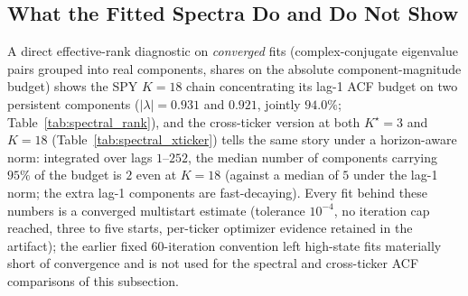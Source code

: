 \subsection{What the Fitted Spectra Do and Do Not Show}
\label{sec:fitted_spectra}

A direct effective-rank diagnostic on \emph{converged} fits (complex-conjugate eigenvalue pairs grouped into real components, shares on the absolute component-magnitude budget) shows the SPY $K = 18$ chain concentrating its lag-1 ACF budget on two persistent components ($|\lambda| = 0.931$ and $0.921$, jointly $94.0\%$; Table~\ref{tab:spectral_rank}), and the cross-ticker version at both $K^\star = 3$ and $K = 18$ (Table~\ref{tab:spectral_xticker}) tells the same story under a horizon-aware norm: integrated over lags $1$--$252$, the median number of components carrying $95\%$ of the budget is $2$ even at $K = 18$ (against a median of $5$ under the lag-1 norm; the extra lag-1 components are fast-decaying). Every fit behind these numbers is a converged multistart estimate (tolerance $10^{-4}$, no iteration cap reached, three to five starts, per-ticker optimizer evidence retained in the artifact); the earlier fixed 60-iteration convention left high-state fits materially short of convergence and is not used for the spectral and cross-ticker ACF comparisons of this subsection.

